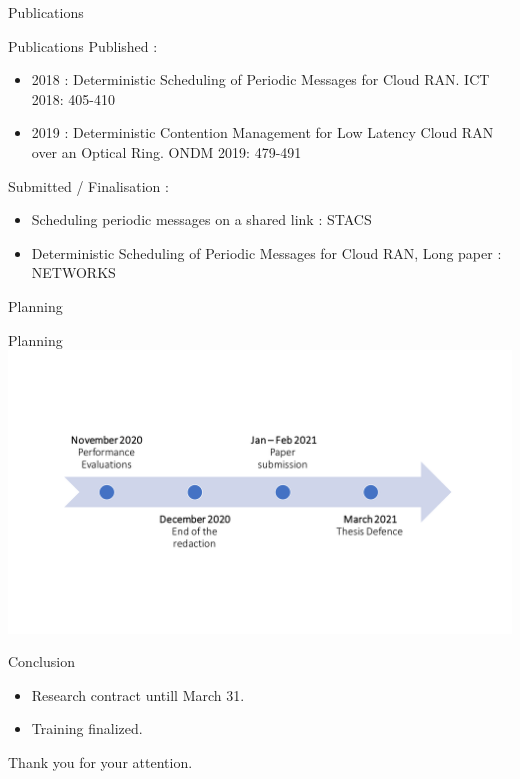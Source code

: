 \documentclass[10 pt]{beamer}
\begin{document}
\begin{section}{Publications}

\begin{frame}{Publications}
	Published : 
   \begin{itemize}
    \item 2018 : Deterministic Scheduling of Periodic Messages for Cloud RAN. ICT 2018: 405-410
       \item 2019 : Deterministic Contention Management for Low Latency Cloud RAN over an Optical Ring. ONDM 2019: 479-491
   \end{itemize}
   
Submitted  / Finalisation : 
   \begin{itemize}
    \item Scheduling periodic messages on a shared link : STACS
       \item Deterministic Scheduling of Periodic Messages for Cloud RAN, Long paper : NETWORKS
   \end{itemize}
   \end{frame}
\end{section}

\begin{section}{Planning}

\begin{frame}{Planning}
\hspace{-1.3cm}\includegraphics[scale=0.4]{timeline}

   \end{frame}
\end{section}


  \begin{frame}{Conclusion}

\begin{itemize}
 \item Research contract untill March 31.
 \item Training finalized.
\end{itemize}
 

\pause
\hspace{2cm}\huge{Thank you for your attention.}
  

\end{frame}
\end{document}
